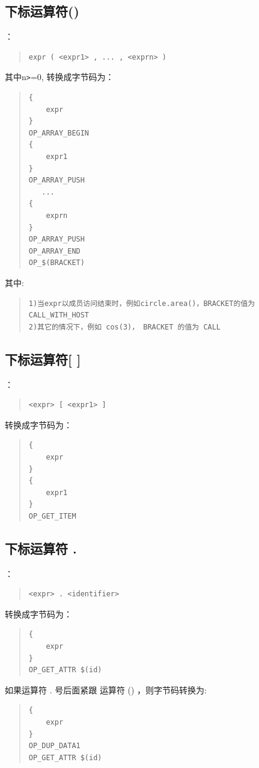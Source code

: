 \subsection{下标运算符()}
：
\begin{quote}
\begin{verbatim}
expr ( <expr1> , ... , <exprn> )  
\end{verbatim}
\end{quote}
其中n\verb|>|=0, 转换成字节码为：
\begin{quote}
\begin{verbatim}
{
    expr
}
OP_ARRAY_BEGIN
{
    expr1
}
OP_ARRAY_PUSH
   ...
{
    exprn
}
OP_ARRAY_PUSH
OP_ARRAY_END 
OP_$(BRACKET)
\end{verbatim}
\end{quote}
其中:
\begin{quote}
\begin{verbatim}
1)当expr以成员访问结束时，例如circle.area()，BRACKET的值为CALL_WITH_HOST
2)其它的情况下，例如 cos(3)， BRACKET 的值为 CALL
\end{verbatim}
\end{quote}
\subsection{下标运算符[ ]}
：
\begin{quote}
\begin{verbatim}
<expr> [ <expr1> ]
\end{verbatim}
\end{quote}
转换成字节码为：
\begin{quote}
\begin{verbatim}
{
    expr
}
{
    expr1
}
OP_GET_ITEM
\end{verbatim}
\end{quote}

\subsection{下标运算符 . }
：
\begin{quote}
\begin{verbatim}
<expr> . <identifier>
\end{verbatim}
\end{quote}
转换成字节码为：
\begin{quote}
\begin{verbatim}
{
    expr
}
OP_GET_ATTR $(id)
\end{verbatim}
\end{quote}
如果运算符 . 号后面紧跟 运算符 () ，则字节码转换为:
\begin{quote}
\begin{verbatim}
{
    expr
}
OP_DUP_DATA1
OP_GET_ATTR $(id)
\end{verbatim}
\end{quote}

